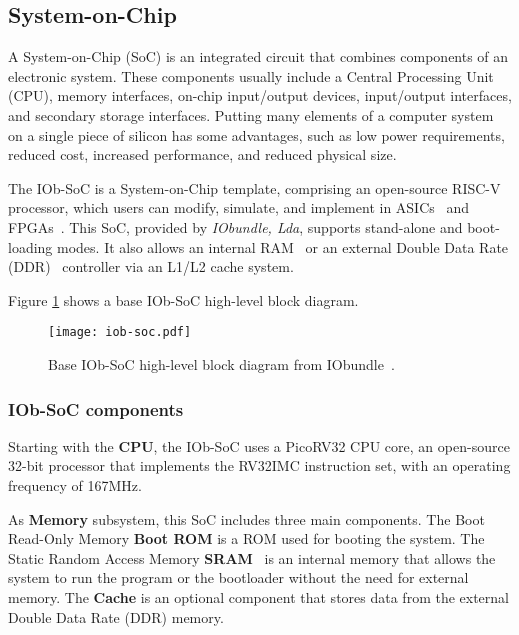 

\subsection{System-on-Chip}
A System-on-Chip (SoC) is an integrated circuit that combines components of an electronic system. These components usually include a Central Processing Unit (CPU), memory interfaces, on-chip input/output devices, input/output interfaces, and secondary storage interfaces. 
Putting many elements of a computer system on a single piece of silicon has some advantages, such as low power requirements, reduced cost, increased performance, and reduced physical size.

The IOb-SoC is a System-on-Chip template, comprising an open-source RISC-V~\cite{riscv} processor, which users can modify, simulate, and implement in ASICs~\cite{asic} and FPGAs~\cite{fpga}.
This SoC, provided by \textit{IObundle, Lda}, supports stand-alone and boot-loading modes. It also allows an internal RAM~\cite{ram} or an external Double Data Rate (DDR)~\cite{ddr} controller via an L1/L2 cache system. 

Figure \ref{fig:iob} shows a base IOb-SoC high-level block diagram.

\vspace{0.1cm}

\begin{figure}[H]
\centerline{\texttt{[image: iob-soc.pdf]}}
\caption{Base IOb-SoC high-level block diagram from IObundle~\cite{iobsoc2022}.}
\label{fig:iob}
\end{figure}

\subsubsection{IOb-SoC components}
Starting with the \textbf{CPU}, the IOb-SoC uses a PicoRV32 CPU core, an open-source 32-bit processor that implements the RV32IMC instruction set, with an operating frequency of 167MHz.

As \textbf{Memory} subsystem, this SoC includes three main components. The Boot Read-Only Memory \textbf{Boot ROM} is a ROM used for booting the system. The Static Random Access Memory \textbf{SRAM}~\cite{sram} is an internal memory that allows the system to run the program or the bootloader without the need for external memory. The \textbf{Cache} is an optional component that stores data from the external Double Data Rate (DDR) memory.

